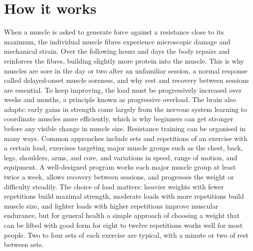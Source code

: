 \section*{How it works}
When a muscle is asked to generate force against a resistance close to its maximum, the individual muscle fibres experience microscopic damage and mechanical strain. Over the following hours and days the body repairs and reinforces the fibres, building slightly more protein into the muscle. This is why muscles are sore in the day or two after an unfamiliar session, a normal response called delayed-onset muscle soreness, and why rest and recovery between sessions are essential. To keep improving, the load must be progressively increased over weeks and months, a principle known as progressive overload. The brain also adapts: early gains in strength come largely from the nervous system learning to coordinate muscles more efficiently, which is why beginners can get stronger before any visible change in muscle size. Resistance training can be organised in many ways. Common approaches include sets and repetitions of an exercise with a certain load, exercises targeting major muscle groups such as the chest, back, legs, shoulders, arms, and core, and variations in speed, range of motion, and equipment. A well-designed program works each major muscle group at least twice a week, allows recovery between sessions, and progresses the weight or difficulty steadily. The choice of load matters: heavier weights with fewer repetitions build maximal strength, moderate loads with more repetitions build muscle size, and lighter loads with higher repetitions improve muscular endurance, but for general health a simple approach of choosing a weight that can be lifted with good form for eight to twelve repetitions works well for most people. Two to four sets of each exercise are typical, with a minute or two of rest between sets.

